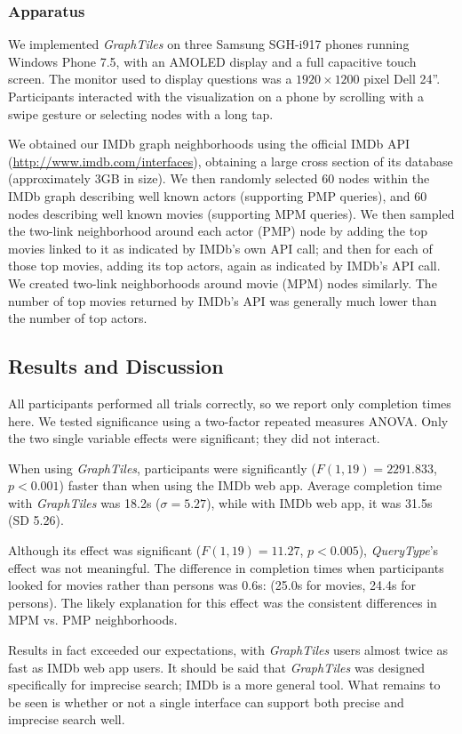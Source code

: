 \subsubsection{Apparatus}

We implemented \textit{GraphTiles} on three Samsung SGH-i917 phones running Windows Phone 7.5, with an AMOLED display and a full capacitive touch screen. The monitor used to display questions was a $1920 \times 1200$ pixel Dell 24''. Participants interacted with the visualization on a phone by scrolling with a swipe gesture or selecting nodes with a long tap.

We obtained our IMDb graph neighborhoods using the official IMDb API (\url{http://www.imdb.com/interfaces}), obtaining a large cross section of its database (approximately 3GB in size). We then randomly selected 60 nodes within the IMDb graph describing well known actors (supporting PMP queries), and 60 nodes describing well known movies (supporting MPM queries). We then sampled the two-link neighborhood around each actor (PMP) node by adding the top movies linked to it as indicated by IMDb's own API call; and then for each of those top movies, adding its top actors, again as indicated by IMDb's API call. We created two-link neighborhoods around movie (MPM) nodes similarly. The number of top movies returned by IMDb's API was generally much lower than the number of top actors. 


\subsection{Results and Discussion}

All participants performed all trials correctly, so we report only completion times here. We tested significance using a two-factor repeated measures ANOVA. Only the two single variable effects were significant; they did not interact. 

When using \textit{GraphTiles}, participants were significantly ($F(1,19)=2291.833$, $p<0.001$) faster than when using the IMDb web app. Average completion time with \textit{GraphTiles} was 18.2s ($\sigma =5.27$), while with IMDb web app, it was 31.5s (SD 5.26).

Although its effect was significant ($F(1,19)=11.27$, $p<0.005$), \textit{QueryType}'s effect was not meaningful. The difference in completion times when participants looked for movies rather than persons was 0.6s: (25.0s for movies, 24.4s for persons). The likely explanation for this effect was the consistent differences in MPM vs. PMP neighborhoods.

Results in fact exceeded our expectations, with \textit{GraphTiles} users almost twice as fast as IMDb web app users. It should be said that \textit{GraphTiles} was designed specifically for imprecise search; IMDb is a more general tool. What remains to be seen is whether or not a single interface can support both precise and imprecise search well.


